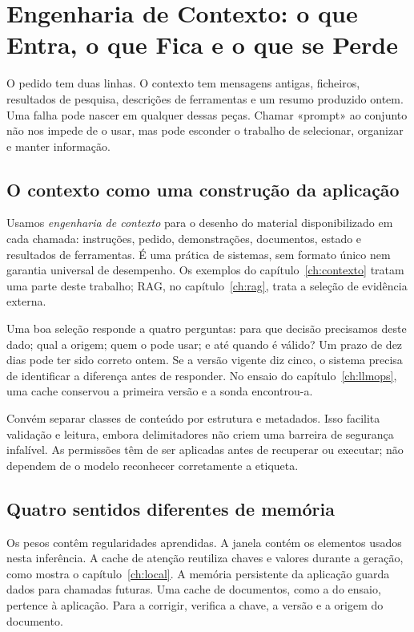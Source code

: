 \chapter{Engenharia de Contexto: o que Entra, o que Fica e o que se Perde}
\label{ch:context-engineering}

O pedido tem duas linhas. O contexto tem mensagens antigas, ficheiros, resultados de pesquisa, descrições de ferramentas e um resumo produzido ontem. Uma falha pode nascer em qualquer dessas peças. Chamar «prompt» ao conjunto não nos impede de o usar, mas pode esconder o trabalho de selecionar, organizar e manter informação.

\section{O contexto como uma construção da aplicação}
Usamos \emph{engenharia de contexto} para o desenho do material disponibilizado em cada chamada: instruções, pedido, demonstrações, documentos, estado e resultados de ferramentas. É uma prática de sistemas, sem formato único nem garantia universal de desempenho. Os exemplos do capítulo~\ref{ch:contexto} tratam uma parte deste trabalho; RAG, no capítulo~\ref{ch:rag}, trata a seleção de evidência externa.

Uma boa seleção responde a quatro perguntas: para que decisão precisamos deste dado; qual a origem; quem o pode usar; e até quando é válido? Um prazo de dez dias pode ter sido correto ontem. Se a versão vigente diz cinco, o sistema precisa de identificar a diferença antes de responder. No ensaio do capítulo~\ref{ch:llmops}, uma cache conservou a primeira versão e a sonda encontrou-a.

Convém separar classes de conteúdo por estrutura e metadados. Isso facilita validação e leitura, embora delimitadores não criem uma barreira de segurança infalível. As permissões têm de ser aplicadas antes de recuperar ou executar; não dependem de o modelo reconhecer corretamente a etiqueta.

\section{Quatro sentidos diferentes de memória}
Os pesos contêm regularidades aprendidas. A janela contém os elementos usados nesta inferência. A cache de atenção reutiliza chaves e valores durante a geração, como mostra o capítulo~\ref{ch:local}. A memória persistente da aplicação guarda dados para chamadas futuras. Uma cache de documentos, como a do ensaio, pertence à aplicação. Para a corrigir, verifica a chave, a versão e a origem do documento.

